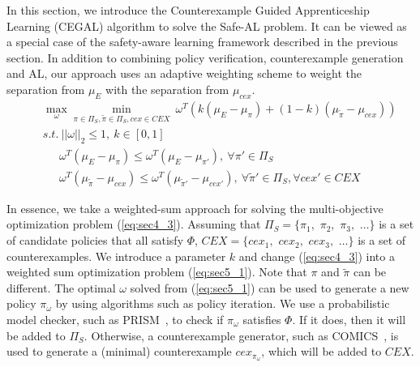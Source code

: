 In this section, we introduce the Counterexample Guided Apprenticeship Learning (CEGAL)
algorithm to solve the Safe-AL problem. 
It can be viewed as a special case of the safety-aware learning framework described in the previous section. 
In addition to combining policy verification, counterexample generation and AL, our approach uses an adaptive weighting scheme to weight the separation from $\mu_E$ with the separation from $\mu_{cex}$.
\begin{eqnarray}
&&\underset{\omega}{\max}\underset{\pi\in\Pi_S,\tilde{\pi}\in\Pi_S, cex\in CEX}{\min}\ \omega^T(k(\mu_E - \mu_{\pi})+(1-k)(\mu_{ \tilde{\pi}}  - \mu_{cex}))\label{eq:sec5_1}\\
&&s.t.\: ||\omega||_2\leq 1 \label{eq:sec5_4},\: k\in[0, 1]\label{eq:sec5_5} \nonumber\\ 
&&\quad\ \:\omega^T(\mu_E - \mu_{\pi})\leq\omega^T(\mu_E - \mu_{\pi'}),\ \forall\pi'\in\Pi_S \label{eq:sec5_2} \nonumber\\ 
&&\quad\ \:\omega^T(\mu_{\tilde{\pi}} - \mu_{cex})\leq\omega^T(\mu_{ \tilde{\pi}'} - \mu_{cex'}),\ \forall \tilde{\pi}'\in\Pi_S, \forall cex'\in{CEX} \nonumber
\end{eqnarray}

In essence, we take a weighted-sum approach for solving the multi-objective optimization problem  (\ref{eq:sec4_3}). Assuming that $\Pi_S=\{\pi_{1},$ $\pi_{2},$ $\pi_{3},$ $\ldots \}$ is a set of candidate policies that all satisfy $\Phi$, ${CEX} =\{cex_1,$ $cex_2,$ $cex_3,$ $\ldots\}$ is a set of counterexamples. We introduce a parameter $k$ and change (\ref{eq:sec4_3}) into a weighted sum optimization problem (\ref{eq:sec5_1}). Note that $\pi$ and $\tilde\pi$ can be different. The optimal $\omega$ solved from (\ref{eq:sec5_1}) can be used to generate a new policy $\pi_\omega$ by using algorithms such as policy iteration. 
We use a probabilistic model checker, such as PRISM~\cite{kwiatkowska2002prism}, to check if $\pi_\omega$ satisfies $\Phi$. If it does, then it will be added to $\Pi_S$. Otherwise, a counterexample generator, such as COMICS~\cite{DBLP:journals/corr/abs-1206-0603}, is used to generate a (minimal) counterexample $cex_{\pi_\omega}$, which will be added to ${CEX}$.  

